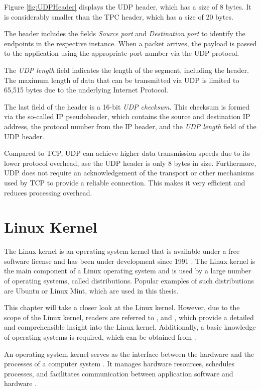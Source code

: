 Figure \ref{fig:UDPHeader} displays the UDP header, which has a size of 8 bytes. It is considerably smaller than the TPC header, which has a size of 20 bytes.

The header includes the fields \textit{Source port} and \textit{Destination port} to identify the endpoints in the respective instance. When a packet arrives, the payload is passed to the application using the appropriate port number via the UDP protocol.

The \textit{UDP length} field indicates the length of the segment, including the header. The maximum length of data that can be transmitted via UDP is limited to 65,515 bytes due to the underlying Internet Protocol.

The last field of the header is a 16-bit \textit{UDP checksum}. This checksum is formed via the so-called IP pseudoheader, which contains the source and destination IP address, the protocol number from the IP header, and the \textit{UDP length} field of the UDP header.

Compared to TCP, UDP can achieve higher data transmission speeds due to its lower protocol overhead, ase the UDP header is only 8 bytes in size. Furthermore, UDP does not require an acknowledgement of the transport or other mechanisms used by TCP to provide a reliable connection. This makes it very efficient and reduces processing overhead.

\clearpage

\section{Linux Kernel}

The Linux kernel is an operating system kernel that is available under a free software license and has been under development since 1991 \cite{like01}. The Linux kernel is the main component of a Linux operating system and is used by a large number of operating systems, called distributions. Popular examples of such distributions are Ubuntu or Linux Mint, which are used in this thesis.

This chapter will take a closer look at the Linux kernel. However, due to the scope of the Linux kernel, readers are referred to \cite{like02}, \cite{like03} and \cite{like08}, which provide a detailed and comprehensible insight into the Linux kernel. Additionally, a basic knowledge of operating systems is required, which can be obtained from \cite{like05}.

An operating system kernel serves as the interface between the hardware and the processes of a computer system \cite{like04}. It manages hardware resources, schedules processes, and facilitates communication between application software and hardware \cite{like06}.


